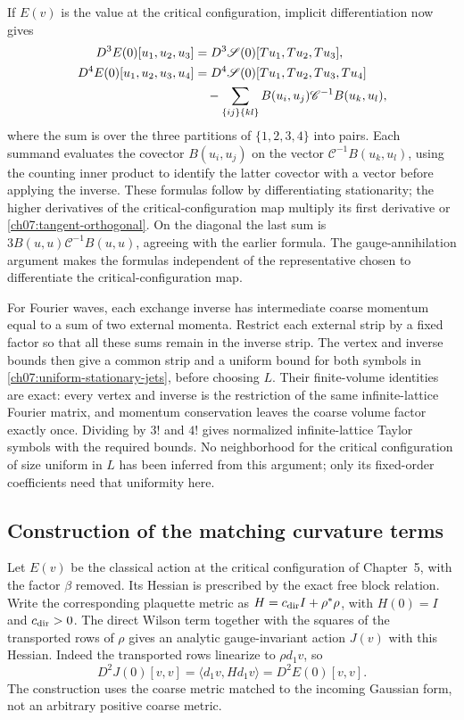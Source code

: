 If $E(v)$ is the value at the critical configuration, implicit differentiation now gives
\begin{align}\label{ch07:uniform-stationary-jets}
 D^3E(0)[u_1,u_2,u_3]
   &=D^3\mathscr S(0)[Tu_1,Tu_2,Tu_3],\\
 D^4E(0)[u_1,u_2,u_3,u_4]
   &=D^4\mathscr S(0)[Tu_1,Tu_2,Tu_3,Tu_4]\notag\\
   &\quad-\sum_{\{ij\}\{kl\}}
          B(u_i,u_j)\mathscr C^{-1}B(u_k,u_l),\notag
\end{align}
where the sum is over the three partitions of $\{1,2,3,4\}$ into pairs.
Each summand evaluates the covector $B(u_i,u_j)$ on the vector
$\mathscr C^{-1}B(u_k,u_l)$, using the counting inner product to
identify the latter covector with a vector before applying the inverse.
These formulas follow by differentiating stationarity; the higher
derivatives of the critical-configuration map multiply its first derivative or
\eqref{ch07:tangent-orthogonal}. On the diagonal the last sum is
$3B(u,u)\mathscr C^{-1}B(u,u)$, agreeing with the earlier formula.
The gauge-annihilation argument makes the formulas independent of the
representative chosen to differentiate the critical-configuration map.

For Fourier waves, each exchange inverse has intermediate coarse
momentum equal to a sum of two external momenta. Restrict each external
strip by a fixed factor so that all these sums remain in the inverse
strip. The vertex and inverse bounds then give a common strip and a
uniform bound for both symbols in
\eqref{ch07:uniform-stationary-jets}, before choosing $L$.
Their finite-volume identities are exact: every vertex and inverse is
the restriction of the same infinite-lattice Fourier matrix, and momentum
conservation leaves the coarse volume factor exactly once. Dividing by
$3!$ and $4!$ gives normalized infinite-lattice Taylor symbols with the required
bounds. No neighborhood for the critical configuration of
size uniform in $L$ has been inferred from this argument; only its
fixed-order coefficients need that uniformity here.

\subsection{Construction of the matching curvature terms}

Let $E(v)$ be the classical action at the critical configuration of Chapter~5, with the
factor $\beta$ removed. Its Hessian is prescribed by the exact free
block relation. Write the corresponding plaquette metric as
$H=c_{\rm dir}I+\rho^*\rho$, with $H(0)=I$ and $c_{\rm dir}>0$.
The direct Wilson term together with the squares of the transported
rows of $\rho$ gives an analytic gauge-invariant action $J(v)$ with
this Hessian. Indeed the transported rows linearize to $\rho d_1v$,
so
\[
 D^2J(0)[v,v]=\langle d_1v,Hd_1v\rangle=D^2E(0)[v,v].
\]
The construction uses the coarse metric matched to the incoming
Gaussian form, not an arbitrary positive coarse metric.

